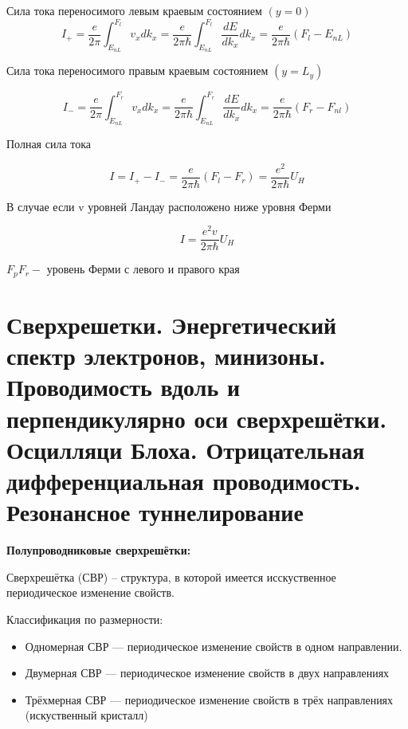 Сила тока переносимого левым краевым состоянием $(y=0)$
$$
I_{+}=\frac{e}{2 \pi} \int_{E_{n L}}^{F_{l}} v_{x} d k_{x}=\frac{e}{2 \pi \hbar} \int_{E_{n L}}^{F_{l}} \frac{d E}{d k_{x}} d k_{x}=\frac{e}{2 \pi \hbar}\left(F_{l}-E_{n L}\right)
$$

Сила тока переносимого правым краевым состоянием $\left(y=L_{y}\right)$

$$
I_{-}=\frac{e}{2 \pi} \int_{E_{n L}}^{F_{r}} v_{x} d k_{x}=\frac{e}{2 \pi \hbar} \int_{E_{n L}}^{F_{r}} \frac{d E}{d k_{x}} d k_{x}=\frac{e}{2 \pi \hbar}\left(F_{r}-F_{n l}\right)
$$

Полная сила тока

$$
I=I_{+}-I_{-}=\frac{e}{2 \pi \hbar}\left(F_{l}-F_{r}\right)=\frac{e^{2}}{2 \pi \hbar} U_{H}
$$

В случае если v уровней Ландау расположено ниже уровня Ферми

$$
I=\frac{e^{2} v}{2 \pi \hbar} U_{H}
$$

$F_{p} F_{r}-$ уровень Ферми с левого и правого края







\section{Сверхрешетки. Энергетический спектр электронов, минизоны. Проводимость вдоль и перпендикулярно оси сверхрешётки. Осцилляци Блоха. Отрицательная дифференциальная проводимость. Резонансное туннелирование}


\textbf{Полупроводниковые сверхрешётки:}


Сверхрешётка (СВР) – структура, в которой имеется исскуственное
периодическое изменение свойств.


Классификация по размерности:
\begin{itemize}
    \item Одномерная СВР --– периодическое изменение свойств в одном направлении.
    \item Двумерная СВР --– периодическое изменение свойств в двух направлениях
    \item Трёхмерная СВР --– периодическое изменение свойств в трёх направлениях (искуственный кристалл)
\end{itemize}


